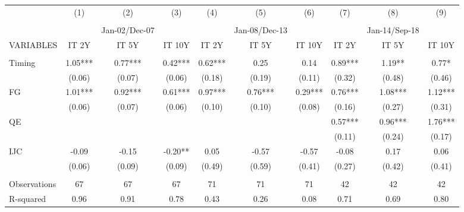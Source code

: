 \begin{tabular}{lccccccccc} \hline
 & (1) & (2) & (3) & (4) & (5) & (6) & (7) & (8) & (9) \\
 &  &  &  &  &  &  &  &  &  \\
 &  & Jan-02/Dec-07 &  &  & Jan-08/Dec-13 &  &  & Jan-14/Sep-18 &  \\
VARIABLES & IT 2Y & IT 5Y & IT 10Y & IT 2Y & IT 5Y & IT 10Y & IT 2Y & IT 5Y & IT 10Y \\ \hline
 &  &  &  &  &  &  &  &  &  \\
Timing & 1.05*** & 0.77*** & 0.42*** & 0.62*** & 0.25 & 0.14 & 0.89*** & 1.19** & 0.77* \\
 & (0.06) & (0.07) & (0.06) & (0.18) & (0.19) & (0.11) & (0.32) & (0.48) & (0.46) \\
FG & 1.01*** & 0.92*** & 0.61*** & 0.97*** & 0.76*** & 0.29*** & 0.76*** & 1.08*** & 1.12*** \\
 & (0.06) & (0.07) & (0.06) & (0.10) & (0.10) & (0.08) & (0.16) & (0.27) & (0.31) \\
QE &  &  &  &  &  &  & 0.57*** & 0.96*** & 1.76*** \\
 &  &  &  &  &  &  & (0.11) & (0.24) & (0.17) \\
IJC & -0.09 & -0.15 & -0.20** & 0.05 & -0.57 & -0.57 & -0.08 & 0.17 & 0.06 \\
 & (0.06) & (0.09) & (0.09) & (0.49) & (0.59) & (0.41) & (0.27) & (0.42) & (0.41) \\
 &  &  &  &  &  &  &  &  &  \\
Observations & 67 & 67 & 67 & 71 & 71 & 71 & 42 & 42 & 42 \\
 R-squared & 0.96 & 0.91 & 0.78 & 0.43 & 0.26 & 0.08 & 0.71 & 0.69 & 0.80 \\ \hline
\end{tabular}
